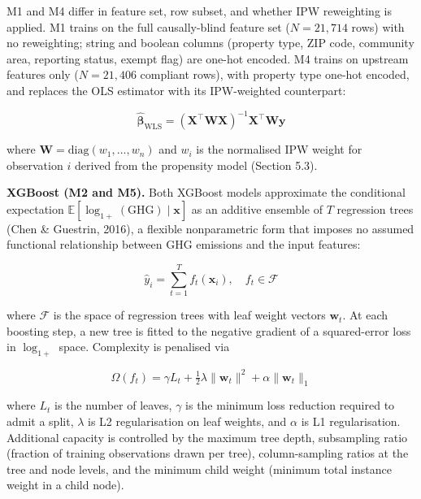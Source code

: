 M1 and M4 differ in feature set, row subset, and whether IPW reweighting is applied. M1 trains on the full causally-blind feature set ($N = 21{,}714$ rows) with no reweighting; string and boolean columns (property type, ZIP code, community area, reporting status, exempt flag) are one-hot encoded. M4 trains on upstream features only ($N = 21{,}406$ compliant rows), with property type one-hot encoded, and replaces the OLS estimator with its IPW-weighted counterpart:

\[
\hat{\boldsymbol{\beta}}_{\text{WLS}} = (\mathbf{X}^\top \mathbf{W} \mathbf{X})^{-1} \mathbf{X}^\top \mathbf{W} \mathbf{y}
\]

where $\mathbf{W} = \mathrm{diag}(w_1, \ldots, w_n)$ and $w_i$ is the normalised IPW weight for observation $i$ derived from the propensity model (Section 5.3).

\textbf{XGBoost (M2 and M5).} Both XGBoost models approximate the conditional expectation $\mathbb{E}[\log_{1+}(\text{GHG}) \mid \mathbf{x}]$ as an additive ensemble of $T$ regression trees (Chen \& Guestrin, 2016), a flexible nonparametric form that imposes no assumed functional relationship between GHG emissions and the input features:

\[
\hat{y}_i = \sum_{t=1}^{T} f_t(\mathbf{x}_i), \quad f_t \in \mathcal{F}
\]

where $\mathcal{F}$ is the space of regression trees with leaf weight vectors $\mathbf{w}_t$. At each boosting step, a new tree is fitted to the negative gradient of a squared-error loss in $\log_{1+}$ space. Complexity is penalised via

\[
\Omega(f_t) = \gamma L_t + \tfrac{1}{2}\lambda \|\mathbf{w}_t\|^2 + \alpha \|\mathbf{w}_t\|_1
\]

where $L_t$ is the number of leaves, $\gamma$ is the minimum loss reduction required to admit a split, $\lambda$ is L2 regularisation on leaf weights, and $\alpha$ is L1 regularisation. Additional capacity is controlled by the maximum tree depth, subsampling ratio (fraction of training observations drawn per tree), column-sampling ratios at the tree and node levels, and the minimum child weight (minimum total instance weight in a child node).

